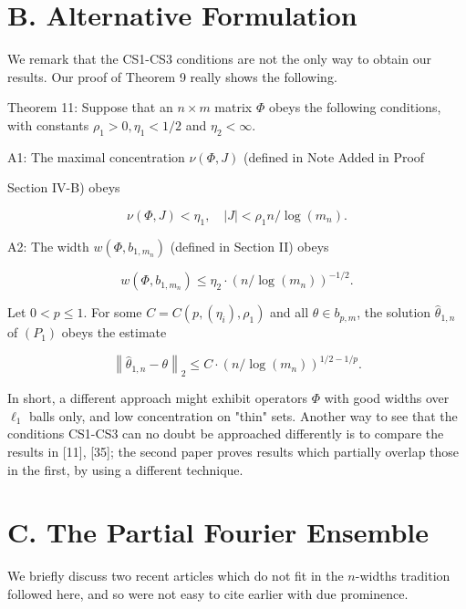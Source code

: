 \documentclass[10pt]{article}
\begin{document}
\section*{B. Alternative Formulation}
We remark that the CS1-CS3 conditions are not the only way to obtain our results. Our proof of Theorem 9 really shows the following.

Theorem 11: Suppose that an $n \times m$ matrix $\Phi$ obeys the following conditions, with constants $\rho_{1}>0, \eta_{1}<1 / 2$ and $\eta_{2}<\infty$.

A1: The maximal concentration $\nu(\Phi, J)$ (defined in Note Added in Proof

Section IV-B) obeys


\begin{equation*}
\nu(\Phi, J)<\eta_{1}, \quad|J|<\rho_{1} n / \log \left(m_{n}\right) . \tag{VIII.1}
\end{equation*}


A2: The width $w\left(\Phi, b_{1, m_{n}}\right)$ (defined in Section II) obeys


\begin{equation*}
w\left(\Phi, b_{1, m_{n}}\right) \leq \eta_{2} \cdot\left(n / \log \left(m_{n}\right)\right)^{-1 / 2} . \tag{VIII.2}
\end{equation*}


Let $0<p \leq 1$. For some $C=C\left(p,\left(\eta_{i}\right), \rho_{1}\right)$ and all $\theta \in b_{p, m}$, the solution $\hat{\theta}_{1, n}$ of $\left(P_{1}\right)$ obeys the estimate

$$
\left\|\hat{\theta}_{1, n}-\theta\right\|_{2} \leq C \cdot\left(n / \log \left(m_{n}\right)\right)^{1 / 2-1 / p} .
$$

In short, a different approach might exhibit operators $\Phi$ with good widths over $\ell_{1}$ balls only, and low concentration on "thin" sets. Another way to see that the conditions CS1-CS3 can no doubt be approached differently is to compare the results in [11], [35]; the second paper proves results which partially overlap those in the first, by using a different technique.

\section*{C. The Partial Fourier Ensemble}
We briefly discuss two recent articles which do not fit in the $n$-widths tradition followed here, and so were not easy to cite earlier with due prominence.
\end{document}
